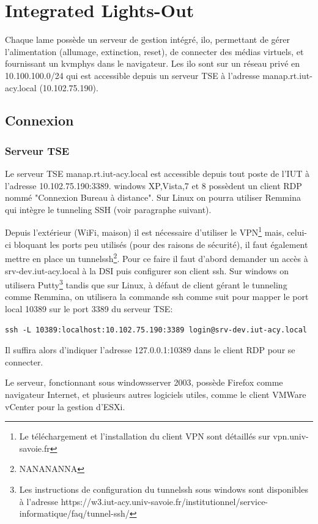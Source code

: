 \documentclass[a4paper,oneside]{report}
\begin{document}
\section{Integrated Lights-Out}
Chaque lame possède un serveur de gestion intégré, \gls{ilo}, permettant de gérer l'alimentation (allumage, extinction, reset), de connecter des médias virtuels, et fournissant un \gls{kvmphys} dans le navigateur.
Les \gls{ilo} sont sur un réseau privé en 10.100.100.0/24 qui est accessible depuis un serveur TSE à l'adresse manap.rt.iut-acy.local (10.102.75.190).

\subsection{Connexion}
\subsubsection{Serveur TSE}
Le serveur TSE manap.rt.iut-acy.local est accessible depuis tout poste de l'IUT à l'adresse 10.102.75.190:3389. \gls{windows} XP,Vista,7 et 8 possèdent un client RDP nommé "Connexion Bureau à distance". Sur Linux on pourra utiliser Remmina qui intègre le tunneling SSH (voir paragraphe suivant).


Depuis l'extérieur (WiFi, maison) il est nécessaire d'utiliser le VPN\footnote{Le téléchargement et l'installation du client VPN sont détaillés sur vpn.univ-savoie.fr} mais, celui-ci bloquant les ports peu utilisés (pour des raisons de sécurité), il faut également mettre en place un \gls{tunnelssh}\footnote{NANANANNA}.
Pour ce faire il faut d'abord demander un accès à srv-dev.iut-acy.local à la DSI puis configurer son client \gls{ssh}.\newline
Sur \gls{windows} on utilisera Putty\footnote{Les instructions de configuration du \gls{tunnelssh} sous \gls{windows} sont disponibles à l'adresse https://w3.iut-acy.univ-savoie.fr/institutionnel/service-informatique/faq/tunnel-ssh/} tandis que sur Linux, à défaut de client gérant le tunneling comme Remmina, on utilisera la commande ssh comme suit pour mapper le port local 10389 sur le port 3389 du serveur TSE:
\label{tunnelingSsh}
\begin{verbatim}
ssh -L 10389:localhost:10.102.75.190:3389 login@srv-dev.iut-acy.local
\end{verbatim}
Il suffira alors d'indiquer l'adresse 127.0.0.1:10389 dans le client RDP pour se connecter.

Le serveur, fonctionnant sous \gls{windowsserver} 2003, possède Firefox comme navigateur Internet, et plusieurs autres logiciels utiles, comme le client VMWare vCenter pour la gestion d'ESXi.
\end{document}
